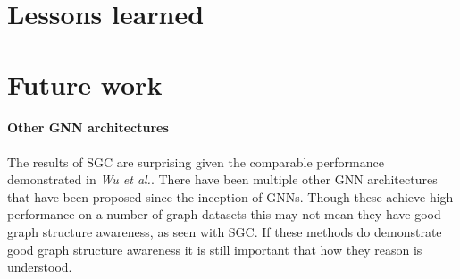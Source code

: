\section{Lessons learned}
%
%

\section{Future work}
\paragraph{Other GNN architectures}
The results of SGC are surprising given the comparable performance demonstrated in \textit{Wu et al.}\cite{wu2019simplifying}.
There have been multiple other GNN architectures that have been proposed since the inception of GNNs.
Though these achieve high performance on a number of graph datasets this may not mean they have good graph structure awareness, as seen with SGC.
If these methods do demonstrate good graph structure awareness it is still important that how they reason is understood.


